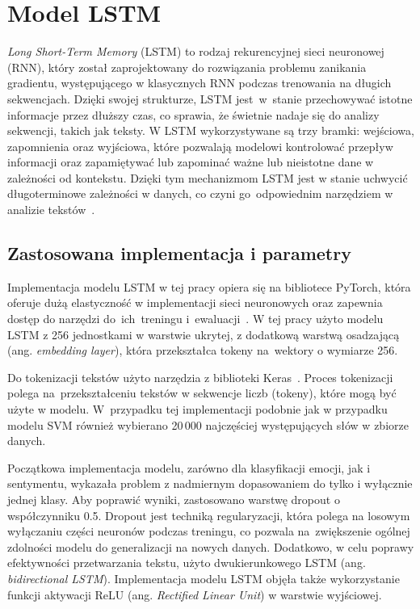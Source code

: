 \section{Model LSTM}
\textit{Long Short-Term Memory} (LSTM) to rodzaj rekurencyjnej sieci neuronowej (RNN), który został zaprojektowany do rozwiązania problemu zanikania gradientu, występującego w klasycznych RNN podczas trenowania na długich sekwencjach. Dzięki swojej strukturze, LSTM jest~w~stanie przechowywać istotne informacje przez dłuższy czas, co sprawia, że świetnie nadaje się do analizy sekwencji, takich jak teksty. W LSTM wykorzystywane są trzy bramki: wejściowa, zapomnienia oraz wyjściowa, które pozwalają modelowi kontrolować przepływ informacji oraz zapamiętywać lub zapominać ważne lub nieistotne dane w zależności od kontekstu. Dzięki tym mechanizmom LSTM jest w stanie uchwycić długoterminowe zależności w danych, co czyni go~odpowiednim narzędziem w analizie tekstów~\cite{LSTMIntroduction}.

\subsection{Zastosowana implementacja i parametry}
Implementacja modelu LSTM w tej pracy opiera się na bibliotece PyTorch, która oferuje dużą elastyczność w implementacji sieci neuronowych oraz zapewnia dostęp do narzędzi do~ich~treningu i~ewaluacji~\cite{PyTorchDocs}. W tej pracy użyto modelu LSTM z 256 jednostkami w warstwie ukrytej, z dodatkową warstwą osadzającą (ang. \textit{embedding layer}), która przekształca tokeny na~wektory o wymiarze 256.

\newpage
Do tokenizacji tekstów użyto narzędzia z biblioteki Keras~\cite{KerasDocs}. Proces tokenizacji polega na~przekształceniu tekstów w sekwencje liczb (tokeny), które mogą być użyte w modelu. W~przypadku tej implementacji podobnie jak w przypadku modelu SVM również wybierano 20\,000 najczęściej występujących słów w zbiorze danych.

Początkowa implementacja modelu, zarówno dla klasyfikacji emocji, jak i sentymentu, wykazała problem z nadmiernym dopasowaniem do tylko i wyłącznie jednej klasy. Aby poprawić wyniki, zastosowano warstwę dropout o współczynniku 0.5. Dropout jest techniką regularyzacji, która polega na losowym wyłączaniu części neuronów podczas treningu, co pozwala na~zwiększenie ogólnej zdolności modelu do generalizacji na nowych danych. Dodatkowo, w celu poprawy efektywności przetwarzania tekstu, użyto dwukierunkowego LSTM (ang. \textit{bidirectional LSTM}). Implementacja modelu LSTM objęła także wykorzystanie funkcji aktywacji ReLU (ang. \textit{Rectified Linear Unit}) w warstwie wyjściowej. 

